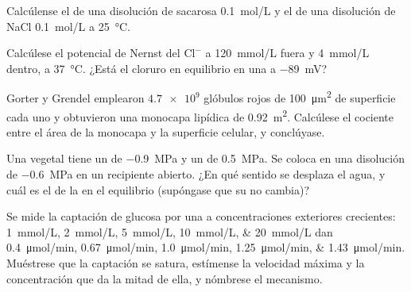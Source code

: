 \begin{exercise}[$\star$]\label{exo:b1:membranes-transport:3}
Calcúlense el  de una disolución de sacarosa
\qty{0.1}{mol/L} y el de una disolución de NaCl \qty{0.1}{mol/L} a
\qty{25}{\celsius}.
\end{exercise}

\begin{exercise}[$\star$]\label{exo:b1:membranes-transport:4}
Calcúlese el potencial de Nernst del $\mathrm{Cl^-}$ a \qty{120}{mmol/L}
fuera y \qty{4}{mmol/L} dentro, a \qty{37}{\celsius}. ¿Está el cloruro en
equilibrio en una  a \qty{-89}{mV}?
\end{exercise}

\begin{exercise}[$\star\star$]\label{exo:b1:membranes-transport:5}
Gorter y Grendel emplearon $\num{4.7e9}$ glóbulos rojos de
\qty{100}{\micro m^2} de superficie cada uno y obtuvieron una monocapa
lipídica de \qty{0.92}{m^2}. Calcúlese el cociente entre el área de la
monocapa y la superficie celular, y conclúyase.
\end{exercise}

\begin{exercise}[$\star\star$]\label{exo:b1:membranes-transport:6}
Una  vegetal tiene un  de \qty{-0.9}{MPa} y un
 de \qty{0.5}{MPa}. Se coloca en una disolución de
 \qty{-0.6}{MPa} en un recipiente abierto. ¿En qué sentido
se desplaza el agua, y cuál es el  de la  en el
equilibrio (supóngase que su  no cambia)?
\end{exercise}

\begin{exercise}[$\star\star$]\label{exo:b1:membranes-transport:7}
Se mide la captación de glucosa por una  a concentraciones exteriores
crecientes: \qtylist{1;2;5;10;20}{mmol/L} dan
\qtylist{0.4;0.67;1.0;1.25;1.43}{\micro mol/min}. Muéstrese que la captación
se satura, estímense la velocidad máxima y la concentración que da la mitad
de ella, y nómbrese el mecanismo.
\end{exercise}

